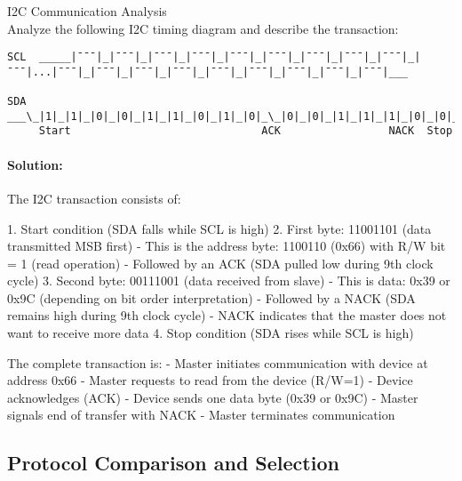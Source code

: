 \begin{example2}{I2C Communication Analysis}\\
Analyze the following I2C timing diagram and describe the transaction:

\begin{verbatim}
SCL  _____|¯¯¯|_|¯¯¯|_|¯¯¯|_|¯¯¯|_|¯¯¯|_|¯¯¯|_|¯¯¯|_|¯¯¯|_|¯¯¯|_|¯¯¯|...|¯¯¯|_|¯¯¯|_|¯¯¯|_|¯¯¯|_|¯¯¯|_|¯¯¯|_|¯¯¯|_|¯¯¯|_|¯¯¯|___
                     
SDA  ___\_|1|_|1|_|0|_|0|_|1|_|1|_|0|_|1|_|0|_\_|0|_|0|_|1|_|1|_|1|_|0|_|0|_|1|_/___
     Start                              ACK                 NACK  Stop
\end{verbatim}

\tcblower
\paragraph{Solution:}
The I2C transaction consists of:

1. Start condition (SDA falls while SCL is high)
2. First byte: 11001101 (data transmitted MSB first)
   - This is the address byte: 1100110 (0x66) with R/W bit = 1 (read operation)
   - Followed by an ACK (SDA pulled low during 9th clock cycle)
3. Second byte: 00111001 (data received from slave)
   - This is data: 0x39 or 0x9C (depending on bit order interpretation)
   - Followed by a NACK (SDA remains high during 9th clock cycle)
   - NACK indicates that the master does not want to receive more data
4. Stop condition (SDA rises while SCL is high)

The complete transaction is:
- Master initiates communication with device at address 0x66
- Master requests to read from the device (R/W=1)
- Device acknowledges (ACK)
- Device sends one data byte (0x39 or 0x9C)
- Master signals end of transfer with NACK
- Master terminates communication
\end{example2}

\subsection{Protocol Comparison and Selection}

